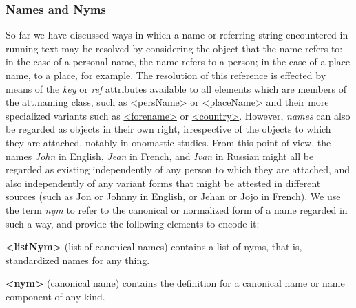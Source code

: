 \subsubsection[{Names and Nyms}]{Names and Nyms}\label{NDNYM}\par
So far we have discussed ways in which a name or referring string encountered in running text may be resolved by considering the object that the name refers to: in the case of a personal name, the name refers to a person; in the case of a place name, to a place, for example. The resolution of this reference is effected by means of the {\itshape key} or {\itshape ref} attributes available to all elements which are members of the \textsf{att.naming} class, such as \hyperref[TEI.persName]{<persName>} or \hyperref[TEI.placeName]{<placeName>} and their more specialized variants such as \hyperref[TEI.forename]{<forename>} or \hyperref[TEI.country]{<country>}. However, \textit{names} can also be regarded as objects in their own right, irrespective of the objects to which they are attached, notably in onomastic studies. From this point of view, the names \textit{John} in English, \textit{Jean} in French, and \textit{Ivan} in Russian might all be regarded as existing independently of any person to which they are attached, and also independently of any variant forms that might be attested in different sources (such as Jon or Johnny in English, or Jehan or Jojo in French). We use the term \textit{nym} to refer to the canonical or normalized form of a name regarded in such a way, and provide the following elements to encode it: 
\begin{sansreflist}
  
\item [\textbf{<listNym>}] (list of canonical names) contains a list of nyms, that is, standardized names for any thing.
\item [\textbf{<nym>}] (canonical name) contains the definition for a canonical name or name component of any kind.
\end{sansreflist}
\par
